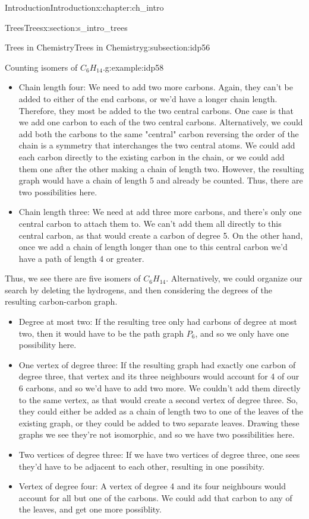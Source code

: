 \documentclass[oneside,10pt,]{book}
\numberwithin{equation}{section}
\begin{document}
\begin{chapterptx}{Introduction}{}{Introduction}{}{}{x:chapter:ch_intro}
\begin{sectionptx}{Trees}{}{Trees}{}{}{x:section:s_intro_trees}
\begin{subsectionptx}{Trees in Chemistry}{}{Trees in Chemistry}{}{}{g:subsection:idp56}
\begin{example}{Counting isomers of \(C_6H_{14}\).}{g:example:idp58}
\begin{itemize}[label=\textbullet]
\item{}Chain length four: We need to add two more carbons.  Again, they can't be added to either of the end carbons, or we'd have a longer chain length.  Therefore, they most be added to the two central carbons.  One case is that we add one carbon to each of the two central carbons.  Alternatively, we could add both the carbons to the same "central" carbon reversing the order of the chain is a symmetry that interchanges the two central atoms.  We could add each carbon directly to the existing carbon in the chain, or we could add them one after the other making a chain of length two.  However, the resulting graph would have a chain of length 5 and already be counted.   Thus, there are two possibilities here.%
\item{}Chain length three: We need at add three more carbons, and there's only one central carbon to attach them to.  We can't add them all directly to this central carbon, as that would create a carbon of degree 5.  On the other hand, once we add a chain of length longer than one to this central carbon we'd have a path of length 4 or greater.%
\end{itemize}
Thus, we see there are five isomers of \(C_6H_{14}\).  Alternatively, we could organize our search by deleting the hydrogens, and then considering the degrees of the resulting carbon-carbon graph.%
%
\begin{itemize}[label=\textbullet]
\item{}Degree at most two: If the resulting tree only had carbons of degree at most two, then it would have to be the path graph \(P_6\), and so we only have one possibility here.%
\item{}One vertex of degree three: If the resulting graph had exactly one carbon of degree three, that vertex and its three neighbours would account for 4 of our 6 carbons, and so we'd have to add two more.  We couldn't add them directly to the same vertex, as that would create a second vertex of degree three.  So, they could either be added as a chain of length two to one of the leaves of the existing graph, or they could be added to two separate leaves.  Drawing these graphs we see they're not isomorphic, and so we have two possibilities here.%
\item{}Two vertices of degree three: If we have two vertices of degree three, one sees they'd have to be adjacent to each other, resulting in one possibity.%
\item{}Vertex of degree four: A vertex of degree 4 and its four neighbours would account for all but one of the carbons.  We could add that carbon to any of the leaves, and get one more possiblity.%

\end{itemize}
\end{example}
\end{subsectionptx}
\end{sectionptx}
\end{chapterptx}
\end{document}
